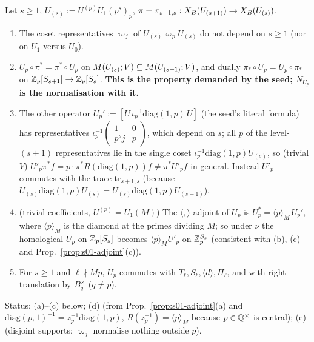 \begin{lemma}[properties of $N_{U_p}$]\label{lem:s01-Up}
Let $s\ge1$, $U_{(s)}:=U^{(p)}U_1(p^s)_p$, $\pi=\pi_{s+1,s}:X_B(U_{(s+1)})\to X_B(U_{(s)})$.
\begin{enumerate}[label=(\alph*)]
\item The coset representatives $\varpi_j$ of $U_{(s)}\varpi_pU_{(s)}$ do not depend on $s\ge1$ (nor on $U_1$ versus $U_0$).
\item $U_p\circ\pi^*=\pi^*\circ U_p$ on $M(U_{(s)};V)\subseteq M(U_{(s+1)};V)$, and dually $\pi_*\circ U_p=U_p\circ\pi_*$
  on $\mathbb{Z}_p[S_{s+1}]\to\mathbb{Z}_p[S_s]$. \textbf{This is the property demanded by the seed; $N_{U_p}$ is the normalisation with it.}
\item The other operator $U_p':=[U\,\iota_p^{-1}\mathrm{diag}(1,p)\,U]$ (the seed's literal formula) has representatives
  $\iota_p^{-1}\left(\begin{smallmatrix}1&0\\p^sj&p\end{smallmatrix}\right)$, which depend on $s$; all $p$ of the level-$(s+1)$
  representatives lie in the single coset $\iota_p^{-1}\mathrm{diag}(1,p)U_{(s)}$, so (trivial $V$) $U'_p\pi^*f=p\cdot\pi^*R(\mathrm{diag}(1,p))f\ne\pi^*U'_pf$
  in general. Instead $U'_p$ commutes with the trace $\mathrm{tr}_{s+1,s}$ (because $U_{(s)}\mathrm{diag}(1,p)U_{(s)}=U_{(s)}\mathrm{diag}(1,p)U_{(s+1)}$).
\item (trivial coefficients, $U^{(p)}=U_1(M)$) The $\langle,\rangle$-adjoint of $U_p$ is $U_p^*=\langle p\rangle_M\,U_p'$, where
  $\langle p\rangle_M$ is the diamond at the primes dividing $M$; so under $\nu$ the homological $U_p$ on $\mathbb{Z}_p[S_s]$ becomes
  $\langle p\rangle_MU'_p$ on $\mathbb{Z}_p^{S_s}$ (consistent with (b), (c) and Prop.~\ref{prop:s01-adjoint}(c)).
\item For $s\ge1$ and $\ell\nmid Mp$, $U_p$ commutes with $T_\ell,S_\ell,\langle d\rangle,\Pi_\ell$, and with right translation by
  $B_q^\times$ ($q\ne p$).
\end{enumerate}
Status: (a)--(c) \stproved{} below; (d) \sttoprove{} (from Prop.~\ref{prop:s01-adjoint}(a) and
$\mathrm{diag}(p,1)^{-1}=z_p^{-1}\mathrm{diag}(1,p)$, $R(z_p^{-1})=\langle p\rangle_M$ because $p\in\mathbb{Q}^\times$ is central);
(e) \stproved{} (disjoint supports; $\varpi_j$ normalise nothing outside $p$).
\end{lemma}
